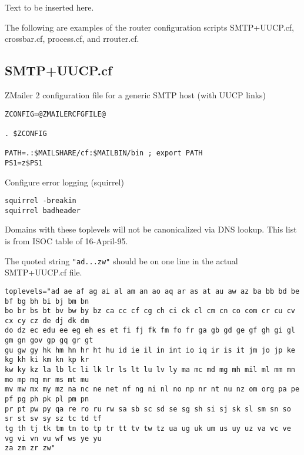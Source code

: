 
Text to be inserted here.

The following are examples of the router configuration scripts SMTP+UUCP.cf, crossbar.cf, process.cf, and rrouter.cf.


\subsection{SMTP+UUCP.cf}

ZMailer 2 configuration file for a generic SMTP host (with UUCP links)

\begin{verbatim}
ZCONFIG=@ZMAILERCFGFILE@

. $ZCONFIG

PATH=.:$MAILSHARE/cf:$MAILBIN/bin ; export PATH
PS1=z$PS1
\end{verbatim}

Configure error logging (squirrel)

\begin{verbatim}
squirrel -breakin
squirrel badheader
\end{verbatim}


Domains with these toplevels will not be canonicalized via DNS lookup.
This list is from ISOC table of 16-April-95.

The quoted string {\tt "ad...zw"} should be on one line in the actual SMTP+UUCP.cf file.

\begin{verbatim}
toplevels="ad ae af ag ai al am an ao aq ar as at au aw az ba bb bd be bf bg bh bi bj bm bn 
bo br bs bt bv bw by bz ca cc cf cg ch ci ck cl cm cn co com cr cu cv cx cy cz de dj dk dm 
do dz ec edu ee eg eh es et fi fj fk fm fo fr ga gb gd ge gf gh gi gl gm gn gov gp gq gr gt 
gu gw gy hk hm hn hr ht hu id ie il in int io iq ir is it jm jo jp ke kg kh ki km kn kp kr 
kw ky kz la lb lc li lk lr ls lt lu lv ly ma mc md mg mh mil ml mm mn mo mp mq mr ms mt mu 
mv mw mx my mz na nc ne net nf ng ni nl no np nr nt nu nz om org pa pe pf pg ph pk pl pm pn 
pr pt pw py qa re ro ru rw sa sb sc sd se sg sh si sj sk sl sm sn so sr st sv sy sz tc td tf 
tg th tj tk tm tn to tp tr tt tv tw tz ua ug uk um us uy uz va vc ve vg vi vn vu wf ws ye yu 
za zm zr zw"
\end{verbatim}



